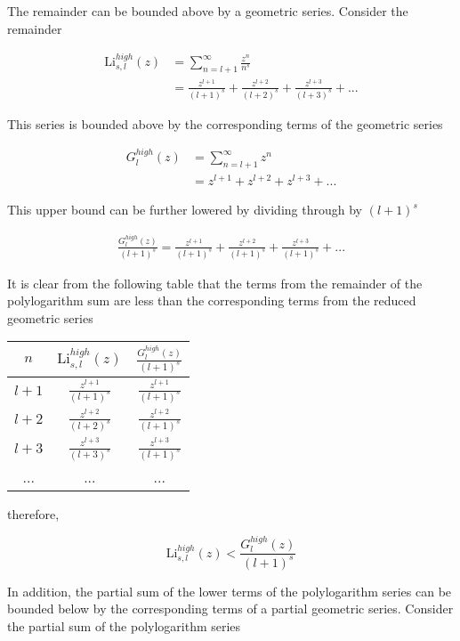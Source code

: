 \documentclass[letterpaper,12pt]{article}
\newcommand{\Li}{\textrm{Li}}
\begin{document}
The remainder can be bounded above by a geometric series. Consider the remainder 

\begin{align} \label{eq:38}
\Li_{s,l}^{high}(z) &= \sum_{n = l + 1}^{\infty} \frac{z^{n}}{n^{s}} \\
 &= \frac{z^{l+1}}{(l+1)^{s}} + \frac{z^{l+2}}{(l+2)^{s}} + \frac{z^{l+3}}{(l+3)^{s}} + ...
\end{align}

\noindent This series is bounded above by the corresponding terms of the geometric series

\begin{align} \label{eq:39}
G_{l}^{high}(z) &= \sum_{n = l + 1}^{\infty} z^{n} \\
 &= z^{l+1} + z^{l+2} + z^{l+3} + ...
\end{align}

\noindent This upper bound can be further lowered by dividing through by $(l + 1)^{s}$

\begin{align} \label{eq:40}
\frac{G_{l}^{high}(z)}{(l+1)^{s}} = 
\frac{z^{l+1}}{(l+1)^{s}} + \frac{z^{l+2}}{(l+1)^{s}} + \frac{z^{l+3}}{(l+1)^{s}} + ...
\end{align}

It is clear from the following table that the terms from the remainder of the polylogarithm sum are less than the corresponding terms from the reduced geometric series 

\begin{tabular}{ccc}
$n$ & $\Li_{s,l}^{high}(z)$ & $\frac{G_{l}^{high}(z)}{(l+1)^{s}}$ \\
\hline
$l+1$ & $\frac{z^{l+1}}{(l+1)^{s}}$ & $\frac{z^{l+1}}{(l+1)^{s}}$ \\
$l+2$ & $\frac{z^{l+2}}{(l+2)^{s}}$ & $\frac{z^{l+2}}{(l+1)^{s}}$ \\
$l+3$ & $\frac{z^{l+3}}{(l+3)^{s}}$ & $\frac{z^{l+3}}{(l+1)^{s}}$ \\
... & ... & ... \\
\end{tabular}

\noindent therefore,

\begin{equation} \label{eq:41}
\Li_{s,l}^{high}(z) < \frac{G_{l}^{high}(z)}{(l+1)^{s}}
\end{equation}

In addition, the partial sum of the lower terms of the polylogarithm series can be bounded below by the corresponding terms of a partial geometric series. Consider the partial sum of the polylogarithm series
\end{document}
